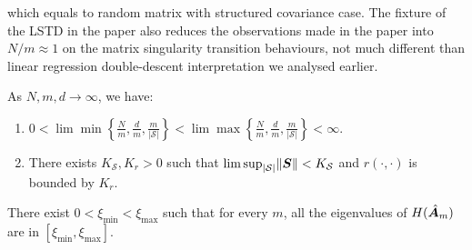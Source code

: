 which equals to random matrix with structured covariance case. The fixture of the LSTD in the paper also reduces the observations made in the paper into $N/m\approx 1$ on the matrix singularity transition behaviours, not much different than linear regression double-descent interpretation we analysed earlier. 
\begin{assumption}
    As $N, m, d \to \infty$, we have:
    \begin{enumerate}[itemsep=1pt,topsep=1pt]
        \item $0 <  \lim\min \left\{\tfrac{N}{m}, \tfrac{d}{m}, \tfrac{m}{\lvert \mathcal{S} \rvert}\right\} < \lim \max \left\{\tfrac{N}{m}, \tfrac{d}{m}, \tfrac{m}{\lvert \mathcal{S} \rvert}\right\} < \infty$. 
        \item There exists $K_\mathcal{S}, K_r>0$ such that $\lim \sup_{\lvert \mathcal{S} \rvert} \lVert {\bm{S}} \rVert < K_\mathcal{S}$ and $r(\cdot, \cdot)$ is bounded by $K_r$. 
    \end{enumerate}
    \label{assumption:growth_rate}
\end{assumption}

\begin{assumption}
    There exist $0 < \xi_{\min} < \xi_{\max}$ such that for every $m$, all the eigenvalues of $H(\hat {{\bm{A}}}_m)$ are in $[\xi_{\min}, \xi_{\max}]$.
    \label{assumption:regime_n}
\end{assumption}

